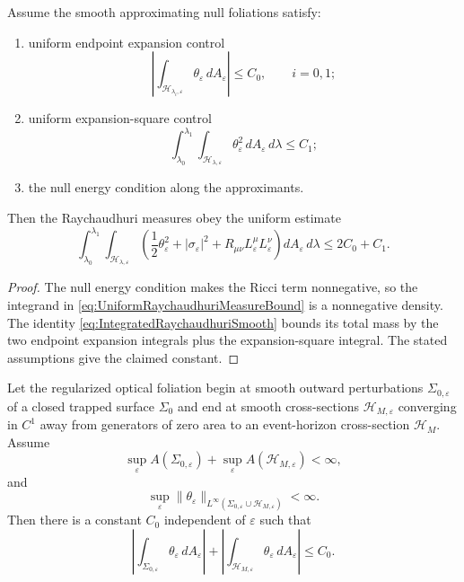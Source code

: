 \begin{proposition}\label{prop:UniformRaychaudhuriMeasureBound}
Assume the smooth approximating null foliations satisfy:
\begin{enumerate}
    \item uniform endpoint expansion control
    \[
        \left|
        \int_{\mathcal H_{\lambda_i,\varepsilon}}
        \theta_\varepsilon\,dA_\varepsilon
        \right|
        \le C_0,\qquad i=0,1;
    \]
    \item uniform expansion-square control
    \[
        \int_{\lambda_0}^{\lambda_1}
        \int_{\mathcal H_{\lambda,\varepsilon}}
        \theta_\varepsilon^2\,dA_\varepsilon\,d\lambda
        \le C_1;
    \]
    \item the null energy condition along the approximants.
\end{enumerate}
Then the Raychaudhuri measures obey the uniform estimate
\begin{equation}\label{eq:UniformRaychaudhuriMeasureBound}
    \int_{\lambda_0}^{\lambda_1}
    \int_{\mathcal H_{\lambda,\varepsilon}}
    \left(
        \frac12\theta_\varepsilon^2
        +|\sigma_\varepsilon|^2
        +R_{\mu\nu}L_\varepsilon^\mu L_\varepsilon^\nu
    \right)
    dA_\varepsilon\,d\lambda
    \le 2C_0+C_1 .
\end{equation}
\end{proposition}

\begin{proof}
The null energy condition makes the Ricci term nonnegative, so the integrand in \eqref{eq:UniformRaychaudhuriMeasureBound} is a nonnegative density. The identity \eqref{eq:IntegratedRaychaudhuriSmooth} bounds its total mass by the two endpoint expansion integrals plus the expansion-square integral. The stated assumptions give the claimed constant.
\end{proof}

\begin{lemma}\label{lem:EndpointExpansionControl}
Let the regularized optical foliation begin at smooth outward perturbations $\Sigma_{0,\varepsilon}$ of a closed trapped surface $\Sigma_0$ and end at smooth cross-sections $\mathcal H_{M,\varepsilon}$ converging in $C^1$ away from generators of zero area to an event-horizon cross-section $\mathcal H_M$. Assume
\[
    \sup_\varepsilon A(\Sigma_{0,\varepsilon})+
    \sup_\varepsilon A(\mathcal H_{M,\varepsilon})<\infty,
\]
and
\[
    \sup_\varepsilon
    \|\theta_\varepsilon\|_{L^\infty(\Sigma_{0,\varepsilon}\cup\mathcal H_{M,\varepsilon})}
    <\infty .
\]
Then there is a constant $C_0$ independent of $\varepsilon$ such that
\[
    \left|
    \int_{\Sigma_{0,\varepsilon}}\theta_\varepsilon\,dA_\varepsilon
    \right|
    +
    \left|
    \int_{\mathcal H_{M,\varepsilon}}\theta_\varepsilon\,dA_\varepsilon
    \right|
    \le C_0 .
\]
\end{lemma}

